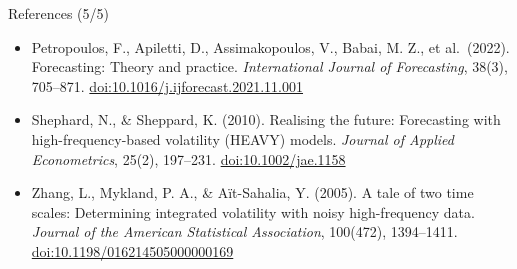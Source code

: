 \begin{frame}{References (5/5)}
\begin{itemize}
    \item Petropoulos, F., Apiletti, D., Assimakopoulos, V., Babai, M. Z., et al.\ (2022). Forecasting: Theory and practice. \textit{International Journal of Forecasting}, 38(3), 705--871. \href{https://doi.org/10.1016/j.ijforecast.2021.11.001}{doi:10.1016/j.ijforecast.2021.11.001}
    \item Shephard, N., \& Sheppard, K. (2010). Realising the future: Forecasting with high-frequency-based volatility (HEAVY) models. \textit{Journal of Applied Econometrics}, 25(2), 197--231. \href{https://doi.org/10.1002/jae.1158}{doi:10.1002/jae.1158}
    \item Zhang, L., Mykland, P. A., \& Aït-Sahalia, Y. (2005). A tale of two time scales: Determining integrated volatility with noisy high-frequency data. \textit{Journal of the American Statistical Association}, 100(472), 1394--1411. \href{https://doi.org/10.1198/016214505000000169}{doi:10.1198/016214505000000169}
\end{itemize}
\end{frame}


